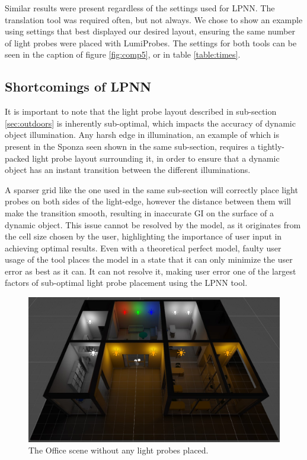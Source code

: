 Similar results were present regardless of the settings used for LPNN. The translation tool was required often, but not always. We chose to show an example using settings that best displayed our desired layout, ensuring the same number of light probes were placed with LumiProbes. The settings for both tools can be seen in the caption of figure \ref{fig:comp5}, or in table \ref{table:times}.

\subsection{Shortcomings of LPNN}
\label{sec:short}

It is important to note that the light probe layout described in sub-section \ref{sec:outdoors} is inherently sub-optimal, which impacts the accuracy of dynamic object illumination. Any harsh edge in illumination, an example of which is present in the Sponza seen shown in the same sub-section, requires a tightly-packed light probe layout surrounding it, in order to ensure that a dynamic object has an instant transition between the different illuminations.

A sparser grid like the one used in the same sub-section will correctly place light probes on both sides of the light-edge, however the distance between them will make the transition smooth, resulting in inaccurate GI on the surface of a dynamic object. This issue cannot be resolved by the model, as it originates from the cell size chosen by the user, highlighting the importance of user input in achieving optimal results. Even with a theoretical perfect model, faulty user usage of the tool places the model in a state that it can only minimize the user error as best as it can. It can not resolve it, making user error one of the largest factors of sub-optimal light probe placement using the LPNN tool.\newline

\begin{figure}[h]
	\centering
	\includegraphics[width=\linewidth]{Graphics/results/office.jpg}
	\caption{The Office scene \parencite{Office2021} without any light probes placed.}
	\label{fig:office}
\end{figure}

